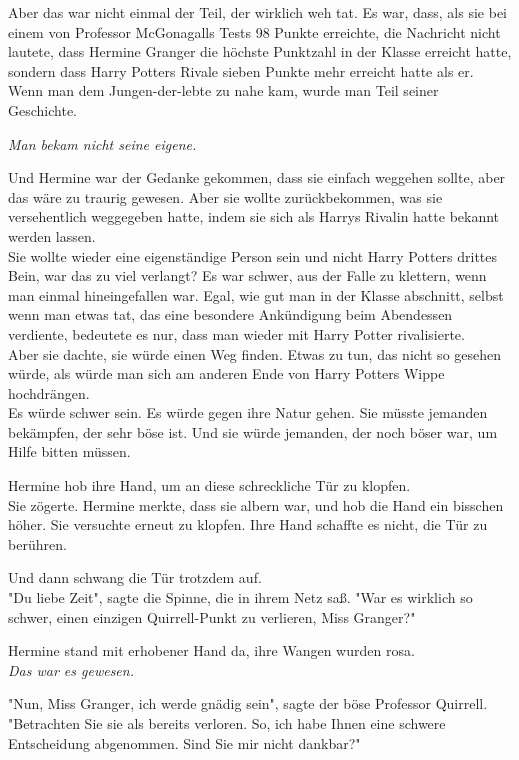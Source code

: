 {Aber das war nicht einmal der Teil, der wirklich weh tat. Es war, dass, als sie bei einem von Professor McGonagalls Tests 98 Punkte erreichte, die Nachricht nicht lautete, dass Hermine Granger die höchste Punktzahl in der Klasse erreicht hatte, sondern dass Harry Potters Rivale sieben Punkte mehr erreicht hatte als er.\\ Wenn man dem Jungen-der-lebte zu nahe kam, wurde man Teil seiner Geschichte.

\emph{Man bekam nicht seine eigene.}

Und Hermine war der Gedanke gekommen, dass sie einfach weggehen sollte, aber das wäre zu traurig gewesen. Aber sie wollte zurückbekommen, was sie versehentlich weggegeben hatte, indem sie sich als Harrys Rivalin hatte bekannt werden lassen.\\ Sie wollte wieder eine eigenständige Person sein und nicht Harry Potters drittes Bein, war das zu viel verlangt? Es war schwer, aus der Falle zu klettern, wenn man einmal hineingefallen war. Egal, wie gut man in der Klasse abschnitt, selbst wenn man etwas tat, das eine besondere Ankündigung beim Abendessen verdiente, bedeutete es nur, dass man wieder mit Harry Potter rivalisierte.\\ Aber sie dachte, sie würde einen Weg finden. Etwas zu tun, das nicht so gesehen würde, als würde man sich am anderen Ende von Harry Potters Wippe hochdrängen.\\ Es würde schwer sein. Es würde gegen ihre Natur gehen. Sie müsste jemanden bekämpfen, der sehr böse ist. Und sie würde jemanden, der noch böser war, um Hilfe bitten müssen.

Hermine hob ihre Hand, um an diese schreckliche Tür zu klopfen.\\ Sie zögerte. Hermine merkte, dass sie albern war, und hob die Hand ein bisschen höher. Sie versuchte erneut zu klopfen. Ihre Hand schaffte es nicht, die Tür zu berühren.

Und dann schwang die Tür trotzdem auf.\\ "Du liebe Zeit", sagte die Spinne, die in ihrem Netz saß. "War es wirklich so schwer, einen einzigen Quirrell-Punkt zu verlieren, Miss Granger?"

Hermine stand mit erhobener Hand da, ihre Wangen wurden rosa.\\ \emph{Das war es gewesen.}

"Nun, Miss Granger, ich werde gnädig sein", sagte der böse Professor Quirrell.\\ "Betrachten Sie sie als bereits verloren. So, ich habe Ihnen eine schwere Entscheidung abgenommen. Sind Sie mir nicht dankbar?"

}
